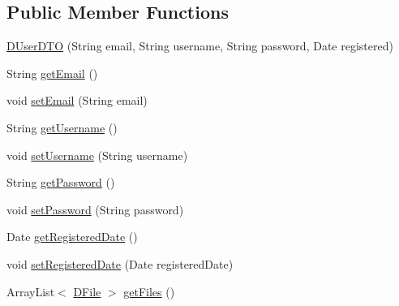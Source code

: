\subsection*{Public Member Functions}
\begin{DoxyCompactItemize}
\item 
\mbox{\hyperlink{classes_1_1deusto_1_1bspq18_1_1e6_1_1_deusto_box_1_1_server_1_1dto_1_1_d_user_d_t_o_aad0716a4872f8d0c62fc725f26db28db}{D\+User\+D\+TO}} (String email, String username, String password, Date registered)
\item 
String \mbox{\hyperlink{classes_1_1deusto_1_1bspq18_1_1e6_1_1_deusto_box_1_1_server_1_1dto_1_1_d_user_d_t_o_a7df6e4aa8cf9d64befaef9d62d11f55b}{get\+Email}} ()
\item 
void \mbox{\hyperlink{classes_1_1deusto_1_1bspq18_1_1e6_1_1_deusto_box_1_1_server_1_1dto_1_1_d_user_d_t_o_a9047d99975cf7e168c55817f380ce9cc}{set\+Email}} (String email)
\item 
String \mbox{\hyperlink{classes_1_1deusto_1_1bspq18_1_1e6_1_1_deusto_box_1_1_server_1_1dto_1_1_d_user_d_t_o_a07f761f0d19fafda1e883cec5eb225af}{get\+Username}} ()
\item 
void \mbox{\hyperlink{classes_1_1deusto_1_1bspq18_1_1e6_1_1_deusto_box_1_1_server_1_1dto_1_1_d_user_d_t_o_abb4bbc0ff2e71dbf2ad2edc08e84df12}{set\+Username}} (String username)
\item 
String \mbox{\hyperlink{classes_1_1deusto_1_1bspq18_1_1e6_1_1_deusto_box_1_1_server_1_1dto_1_1_d_user_d_t_o_a4678b160b67f1d71d7751b95848c99fa}{get\+Password}} ()
\item 
void \mbox{\hyperlink{classes_1_1deusto_1_1bspq18_1_1e6_1_1_deusto_box_1_1_server_1_1dto_1_1_d_user_d_t_o_a5d11fd391b275b06a73fb929aa3f9696}{set\+Password}} (String password)
\item 
Date \mbox{\hyperlink{classes_1_1deusto_1_1bspq18_1_1e6_1_1_deusto_box_1_1_server_1_1dto_1_1_d_user_d_t_o_ab2b707861733cacc6823c5d805c61291}{get\+Registered\+Date}} ()
\item 
void \mbox{\hyperlink{classes_1_1deusto_1_1bspq18_1_1e6_1_1_deusto_box_1_1_server_1_1dto_1_1_d_user_d_t_o_af2fba8eb7b6e286b0c59a5c07a81e3ce}{set\+Registered\+Date}} (Date registered\+Date)
\item 
Array\+List$<$ \mbox{\hyperlink{classes_1_1deusto_1_1bspq18_1_1e6_1_1_deusto_box_1_1_server_1_1jdo_1_1data_1_1_d_file}{D\+File}} $>$ \mbox{\hyperlink{classes_1_1deusto_1_1bspq18_1_1e6_1_1_deusto_box_1_1_server_1_1dto_1_1_d_user_d_t_o_a1c545cc1155b98b2b301d6f62385d857}{get\+Files}} ()
\item 

\end{DoxyCompactItemize}
